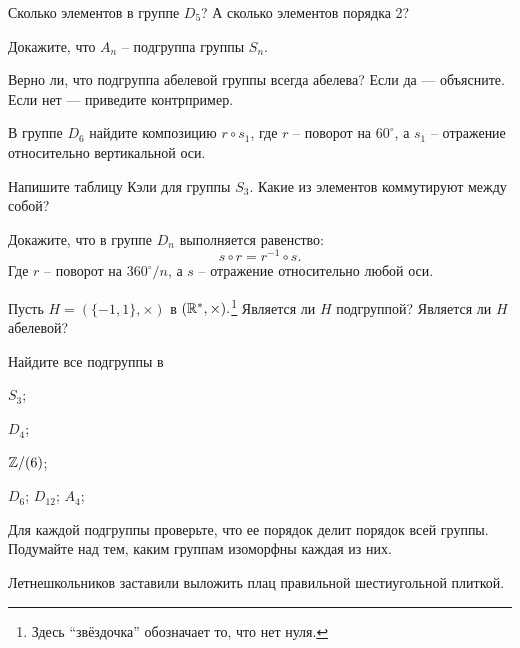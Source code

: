 \begin{tasks}
    \item Сколько элементов в группе $D_5$? А сколько элементов порядка 2?
    \item Докажите, что $A_n$ -- подгруппа группы $S_n$.
    \item Верно ли, что подгруппа абелевой группы всегда абелева? Если да — объясните. Если нет — приведите контрпример.
    \item В группе $D_6$ найдите композицию $r \circ s_1$, где $r$ -- поворот на $60^\circ$, а $s_1$ -- отражение относительно вертикальной оси.
    \item Напишите таблицу Кэли для группы $S_3$. Какие из элементов коммутируют между собой?
    \item Докажите, что в группе $D_n$ выполняется равенство: \[
            s \circ r = r^{-1} \circ s.
        \]
        Где $r$ -- поворот на $360^\circ/n$, а $s$ -- отражение относительно любой оси.
    \item Пусть $H = (\{-1, 1\}, \times)$ в $(\mathbb R^*, \times).$\footnote{Здесь ``звёздочка'' обозначает то, что нет нуля.} Является ли $H$ подгруппой? Является ли $H$ абелевой?
    \item Найдите все подгруппы в 
        \begin{multicols}{3}
            \begin{tasks}
                \item $S_3$;
                \item $D_4$;
                \item $\mathbb Z/(6)$;
                \item $D_6$;
                \moditem{*} $D_{12}$;
                \moditem{*} $A_4$;
            \end{tasks}
        \end{multicols}
    Для каждой подгруппы проверьте, что ее порядок делит порядок всей группы. Подумайте над тем, каким группам изоморфны каждая из них.
    \item Летнешкольников заставили выложить плац правильной шестиугольной плиткой. 

\end{tasks}
